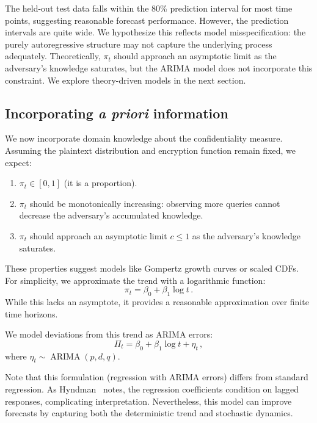 \documentclass[final,11pt]{article}
\newcommand{\arima}{\operatorname{ARIMA}}
\theoremstyle{plain}
\theoremstyle{remark}
\begin{document}
The held-out test data falls within the 80\% prediction interval for most
time points, suggesting reasonable forecast performance. However, the
prediction intervals are quite wide. We hypothesize this reflects model
misspecification: the purely autoregressive structure may not capture the
underlying process adequately. Theoretically, $\pi_t$ should approach an
asymptotic limit as the adversary's knowledge saturates, but the ARIMA
model does not incorporate this constraint. We explore theory-driven models
in the next section.

\hypertarget{incorporating-information}{%
\subsection{\texorpdfstring{Incorporating \emph{a priori}
information}{Incorporating  information}}\label{incorporating-information}}

We now incorporate domain knowledge about the confidentiality measure.
Assuming the plaintext distribution and encryption function remain fixed,
we expect:

\begin{enumerate}
\item $\pi_t \in [0,1]$ (it is a proportion).
\item $\pi_t$ should be monotonically increasing: observing more queries
cannot decrease the adversary's accumulated knowledge.
\item $\pi_t$ should approach an asymptotic limit $c \leq 1$ as the
adversary's knowledge saturates.
\end{enumerate}

These properties suggest models like Gompertz growth curves or scaled CDFs.
For simplicity, we approximate the trend with a logarithmic function:
\begin{equation}
  \pi_t = \beta_0 + \beta_1 \log t\,.
\end{equation}
While this lacks an asymptote, it provides a reasonable approximation over
finite time horizons.

We model deviations from this trend as ARIMA errors:
\begin{equation}
  \Pi_t = \beta_0 + \beta_1 \log t + \eta_t\,,
\end{equation}
where $\eta_t \sim \arima(p,d,q)$.

Note that this formulation (regression with ARIMA errors) differs from
standard regression. As Hyndman~\cite{rob_arimax} notes, the regression
coefficients condition on lagged responses, complicating interpretation.
Nevertheless, this model can improve forecasts by capturing both the
deterministic trend and stochastic dynamics.
\end{document}
